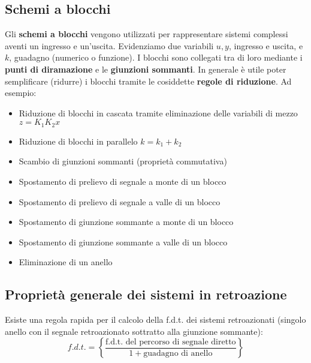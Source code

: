 \documentclass[11pt]{article}
\begin{document}
\subsection{Schemi a blocchi}
Gli \textbf{schemi a blocchi} vengono utilizzati per rappresentare sistemi complessi aventi un ingresso e un'uscita. Evidenziamo due variabili $u,y$, ingresso e uscita, e $k$, guadagno (numerico o funzione). I blocchi sono collegati tra di loro mediante i \textbf{punti di diramazione} e le \textbf{giunzioni sommanti}.
In generale è utile poter semplificare (ridurre) i blocchi tramite le cosiddette \textbf{regole di riduzione}. Ad esempio:
\begin{itemize}
    \item Riduzione di blocchi in cascata tramite eliminazione delle variabili di mezzo $z=K_1K_2x$
    \item Riduzione di blocchi in parallelo $k=k_1+k_2$
    \item Scambio di giunzioni sommanti (proprietà commutativa)
    \item Spostamento di prelievo di segnale a monte di un blocco
    \item Spostamento di prelievo di segnale a valle di un blocco 
    \item Spostamento di giunzione sommante a monte di un blocco 
    \item Spostamento di giunzione sommante a valle di un blocco 
    \item Eliminazione di un anello
\end{itemize}
\subsection{Proprietà generale dei sistemi in retroazione}
Esiste una regola rapida per il calcolo della f.d.t. dei sistemi retroazionati (singolo anello con il segnale retroazionato sottratto alla giunzione sommante):
\begin{displaymath}
    f.d.t. = \left\{\frac{\textrm{f.d.t. del percorso di segnale diretto}}{1+\textrm{guadagno di anello}}\right\}
\end{displaymath}
\end{document}
